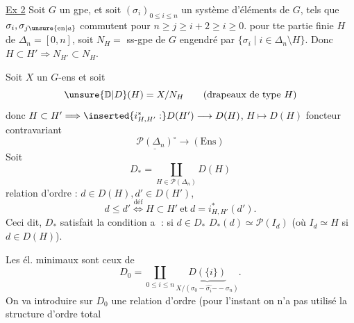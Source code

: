 \uline{Ex 2} Soit $G$ un gpe, et soit $(\sigma_i)_{0\leq i\leq n}$ un système d'éléments de $G$, tels que $\sigma_i,\sigma_{j\unsure{\mathrm{en}|a}}$ commutent pour  $n\geq j\geq i+2\geq i\geq0$. 
pour tte partie finie $H$ de $\Delta_n=[0,n]$, soit  $N_H=$ ss-gpe de $G$ engendré par $\{\sigma_i\mid i\in\Delta_n\setminus H\}$. Donc $H\subset H'\Rightarrow N_{H'}\subset N_H$.

Soit $X$ un $G$-ens et soit
\[
\unsure{\mathbb D|D}(H)=X/N_H\qquad\text{(drapeaux de type }H\text{)}
\]
donc $H\subset H'\Longrightarrow\inserted{i_{H,H'}^*:}D(H')\longrightarrow D(H)$,
$H\longmapsto D(H)$ foncteur contravariant
\[
\underline{\mathscr P(\Delta_n)}^{\circ}\longrightarrow(\mathrm{Ens})
\]
Soit
\[
D_*=\coprod_{H\in\mathscr P(\Delta_n)}D(H)
\]
relation d'ordre : $d\in D(H), d'\in D(H')$,
\[
d\leq d'\mathrel{\overset{\text{déf}}{\Longleftrightarrow}}H\subset H'\ \text{et}\ d=i_{H,H'}^*(d').
\]
Ceci dit, $D_*$ satisfait la condition \textcircled{a} : si $d\in D_*$ $D_*(d)\simeq\mathscr P(I_d)$ (où $I_d\simeq H$ si $d\in D(H)$).

Les él. minimaux sont ceux de
\[
D_0=\coprod_{0\leq i\leq n}\underbrace{D(\{i\})}_{X/(\sigma_0\mathbin{-}\widehat{\sigma_i}\mathbin{--}\sigma_n)}.
\]
On va introduire sur $D_0$ une relation d'ordre (pour l'instant on n'a pas utilisé la structure d'ordre total
